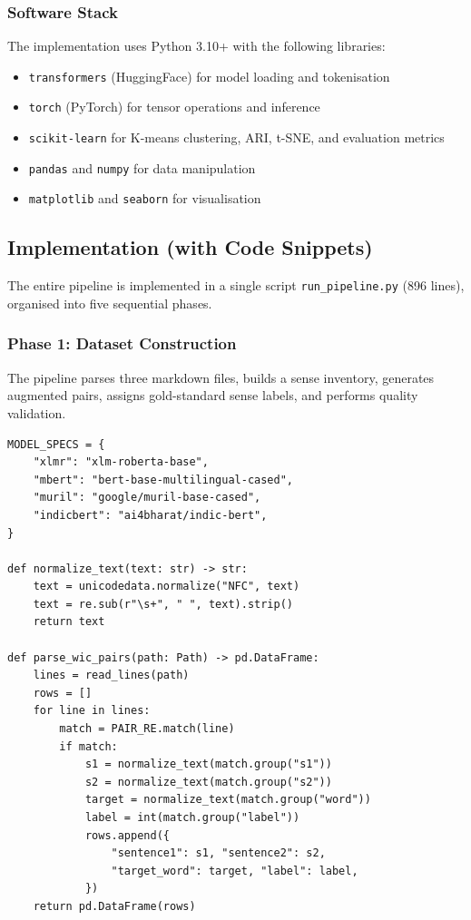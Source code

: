 \documentclass[12pt,a4paper,oneside]{article}
\begin{document}
\subsubsection{Software Stack}

The implementation uses Python 3.10+ with the following libraries:
\begin{itemize}
  \item \texttt{transformers} (HuggingFace) for model loading and tokenisation
  \item \texttt{torch} (PyTorch) for tensor operations and inference
  \item \texttt{scikit-learn} for K-means clustering, ARI, t-SNE, and evaluation metrics
  \item \texttt{pandas} and \texttt{numpy} for data manipulation
  \item \texttt{matplotlib} and \texttt{seaborn} for visualisation
\end{itemize}

\subsection{Implementation (with Code Snippets)}

The entire pipeline is implemented in a single script \texttt{run\_pipeline.py} (896 lines), organised into five sequential phases.

\subsubsection{Phase 1: Dataset Construction}

The pipeline parses three markdown files, builds a sense inventory, generates augmented pairs, assigns gold-standard sense labels, and performs quality validation.

\begin{lstlisting}[caption={Model specifications and data parsing},label=lst:models]
MODEL_SPECS = {
    "xlmr": "xlm-roberta-base",
    "mbert": "bert-base-multilingual-cased",
    "muril": "google/muril-base-cased",
    "indicbert": "ai4bharat/indic-bert",
}

def normalize_text(text: str) -> str:
    text = unicodedata.normalize("NFC", text)
    text = re.sub(r"\s+", " ", text).strip()
    return text

def parse_wic_pairs(path: Path) -> pd.DataFrame:
    lines = read_lines(path)
    rows = []
    for line in lines:
        match = PAIR_RE.match(line)
        if match:
            s1 = normalize_text(match.group("s1"))
            s2 = normalize_text(match.group("s2"))
            target = normalize_text(match.group("word"))
            label = int(match.group("label"))
            rows.append({
                "sentence1": s1, "sentence2": s2,
                "target_word": target, "label": label,
            })
    return pd.DataFrame(rows)
\end{lstlisting}
\end{document}

